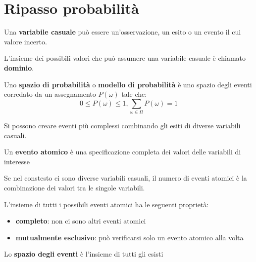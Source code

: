 \chapter{Ripasso probabilità}
\begin{definition}
    Una \textbf{variabile casuale} può essere un'osservazione, un esito o un evento
    il cui valore incerto.
\end{definition}

L'insieme dei possibili valori che può assumere una variabile casuale è chiamato
\textbf{dominio}. 

\begin{definition}
    Uno \textbf{spazio di probabilità} o \textbf{modello di probabilità} è uno spazio
    degli eventi corredato da un assegnamento $P(\omega)$ tale che:
    $$0 \le P(\omega)\le 1, \sum_{\omega\in \Omega} P(\omega) = 1$$
\end{definition}
Si possono creare eventi più complessi combinando gli esiti di diverse variabili 
casuali.
\begin{definition}
    Un \textbf{evento atomico} è una specificazione completa dei valori delle variabili
    di interesse
\end{definition}
Se nel constesto ci sono diverse variabili casuali, il numero di eventi atomici 
è la combinazione dei valori tra le singole variabili.

L'insieme di tutti i possibili eventi atomici ha le seguenti proprietà:
\begin{itemize}
    \item \textbf{completo}: non ci sono altri eventi atomici
    \item \textbf{mutualmente esclusivo}: può verificarsi solo un evento atomico alla volta
\end{itemize}

\begin{definition}
    Lo \textbf{spazio degli eventi} è l'insieme di tutti gli esisti
\end{definition}